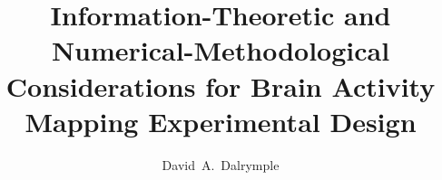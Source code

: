 
%

\title{Information-Theoretic and Numerical-Methodological Considerations for Brain Activity Mapping Experimental Design}

\author[1,2]{David~A.~Dalrymple}


\newcommand\et{{\em \&}}


\renewcommand{\maketitlehookc}{{\small\raggedright Correspondence to: \texttt{david\,\textnormal{(at)}\,\,dalrymple.co}}}


\maketitle
\pagestyle{plain}
\thispagestyle{empty}



